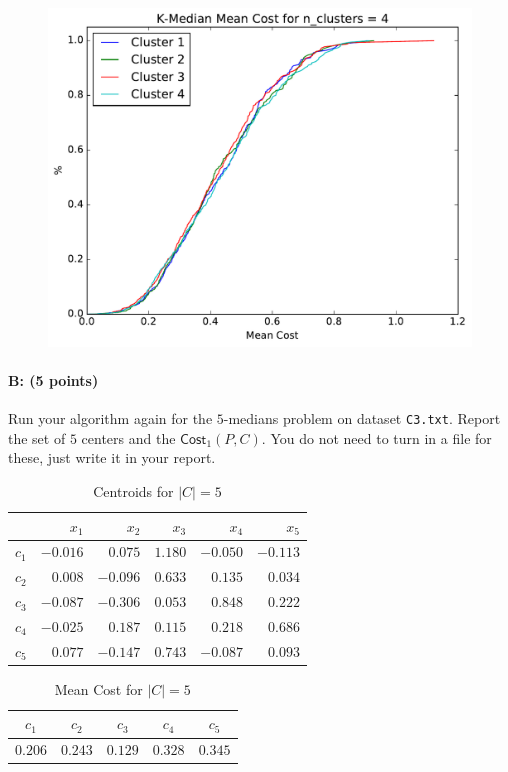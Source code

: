 \documentclass[11pt]{article}
\begin{document}
\begin{figure}[H]
\centering
\includegraphics[width=.75\textwidth]{cdf_median_n-4.pdf}
\end{figure}



\paragraph{B: (5 points)}
Run your algorithm again for the $5$-medians problem on dataset \texttt{C3.txt}.  Report the set of $5$ centers and the $\textsf{Cost}_1(P,C)$.  You do not need to turn in a file for these, just write it in your report.  

\begin{table}[H]
\centering
\caption{Centroids for $\left| C \right| = 5$}
\begin{tabular}{c | r r r r r}
\hline\hline
 & $x_{1}$ & $x_{2}$ & $x_{3}$ & $x_{4}$ & $x_{5}$\\
\hline
$c_{1}$ & $-0.016$ & $0.075$ & $1.180$ & $-0.050$ & $-0.113$\\
$c_{2}$ & $0.008$ & $-0.096$ & $0.633$ & $0.135$ & $0.034$\\
$c_{3}$ & $-0.087$ & $-0.306$ & $0.053$ & $0.848$ & $0.222$\\
$c_{4}$ & $-0.025$ & $0.187$ & $0.115$ & $0.218$ & $0.686$\\
$c_{5}$ & $0.077$ & $-0.147$ & $0.743$ & $-0.087$ & $0.093$\\
\hline
\end{tabular}
\end{table}


\begin{table}[H]
\centering
\caption{Mean Cost for $\left| C \right| = 5$}
\begin{tabular}{c c c c c}
\hline\hline
$c_{1}$ & $c_{2}$ & $c_{3}$ & $c_{4}$ & $c_{5}$\\
\hline
$0.206$ & $0.243$ & $0.129$ & $0.328$ & $0.345$\\
\hline
\end{tabular}
\end{table}
\end{document}

